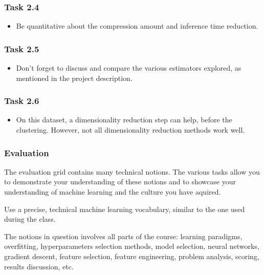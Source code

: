 \documentclass[usenames,dvipsnames,french]{beamer}
\begin{document}
\begin{frame}
    \frametitle{Task 2.4}
    \begin{itemize}
        \item Be quantitative about the compression amount and inference time reduction.
    \end{itemize}
\end{frame}

\begin{frame}
    \frametitle{Task 2.5}
    \begin{itemize}
        \item Don't forget to discuss and compare the various estimators explored, as mentioned in the project description.
    \end{itemize}
\end{frame}

\begin{frame}
    \frametitle{Task 2.6}
    \begin{itemize}
        \item On this dataset, a dimensionality reduction step can help, before the clustering. However, not all dimensionality reduction methods work well.
    \end{itemize}
\end{frame}

\begin{frame}
    \frametitle{Evaluation}
    The evaluation grid contains many technical notions. The various tasks allow you to demonstrate your understanding of these notions and to showcase your understanding of machine learning and the culture you have aquired. 

    Use a precise, technical machine learning vocabulary, similar to the one used during the class.

    The notions in question involves all parts of the course: learning paradigms, overfitting, hyperparameters selection methods, model selection, neural networks, gradient descent, feature selection, feature engineering, problem analysis, scoring, results discussion, etc.
\end{frame}
\end{document}
